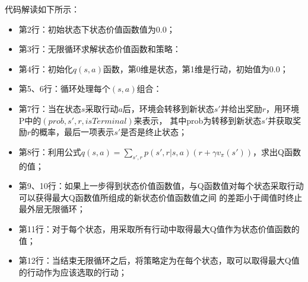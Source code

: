 代码解读如下所示：
\begin{itemize}
    \item 第2行：初始状态下状态价值函数值为0.0；
    \item 第3行：无限循环求解状态价值函数和策略：
    \item 第4行：初始化$q(s,a)$函数，第0维是状态，第1维是行动，初始值为0.0；
    \item 第5、6行：循环处理每个$(s, a)$组合：
    \item 第7行：当在状态$s$采取行动$a$后，环境会转移到新状态$s'$并给出奖励$r$，用环境P中的$(prob, s', r, isTerminal)$来表示，
    其中prob为转移到新状态$s'$并获取奖励$r$的概率，最后一项表示$s'$是否是终止状态；
    \item 第8行：利用公式$q(s, a) = \sum_{s',r} p(s',r|s,a)(r+\gamma v_{\pi}(s'))$，求出Q函数的值；
    \item 第9、10行：如果上一步得到状态价值函数值，与Q函数值对每个状态采取行动可以获得最大Q函数值所组成的新状态价值函数值之间
    的差距小于阈值时终止最外层无限循环；
    \item 第11行：对于每个状态，用采取所有行动中取得最大Q值作为状态价值函数的值；
    \item 第12行：当结束无限循环之后，将策略定为在每个状态，取可以取得最大Q值的行动作为应该选取的行动；
\end{itemize}